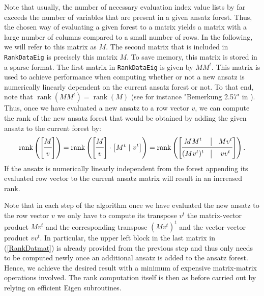 Note that usually, the number of necessary evaluation index value lists by far exceeds the number of variables that are present in a given ansatz forest. Thus, the chosen way of evaluating a given forest to a matrix yields a matrix with a large number of columns compared to a small number of rows. In the following, we will refer to this matrix as $M$. The second matrix that is included in \texttt{RankDataEig} is precisely this matrix $M$. To save memory, this matrix is stored in a sparse format. The first matrix in \texttt{RankDataEig} is given by $M M^t$. This matrix is used to achieve performance when computing whether or not a new ansatz is numerically linearly dependent on the current ansatz forest or not. To that end, note that $\operatorname{rank}(MM^t) = \operatorname{rank}(M)$ (see for instance "Bemerkung 2.57" in \cite{LAKnab}). Thus, once we have evaluated a new ansatz to a row vector $v$, we can compute the rank of the new ansatz forest that would be obtained by adding the given ansatz to the current forest by:
\begin{align}\label{RankDatmat}
    \operatorname{rank}\left (\begin{bmatrix}
        M \\
        \cmidrule(lr){1-1} 
        v
    \end{bmatrix} \right )
    = \operatorname{rank} \left ( \begin{bmatrix}
        M \\
        \cmidrule(lr){1-1}
        v
    \end{bmatrix} \cdot \begin{bmatrix}
        M^t \ \vert \  v^t 
    \end{bmatrix} \right ) = \operatorname{rank} \left (\begin{bmatrix}
        MM^t & \vline & M v^t \\
        \cmidrule(lr){1-3}
        (Mv^t)^t & \vline & vv^t 
    \end{bmatrix}  \right ).
\end{align}
If the ansatz is numerically linearly independent from the forest appending its evaluated row vector to the current ansatz matrix will result in an increased rank.

Note that in each step of the algorithm once we have evaluated the new ansatz to the row vector $v$ we only have to compute its transpose $v^t$ the matrix-vector product $Mv^t$ and the corresponding transpose $(Mv^t)^t$ and the vector-vector product $v v^t$. In particular, the upper left block in the last matrix in (\ref{RankDatmat}) is already provided from the previous step and thus only needs to be computed newly once an additional ansatz is added to the ansatz forest. Hence, we achieve the desired result with a minimum of expensive matrix-matrix operations involved. The rank computation itself is then as before carried out by relying on efficient Eigen subroutines.

